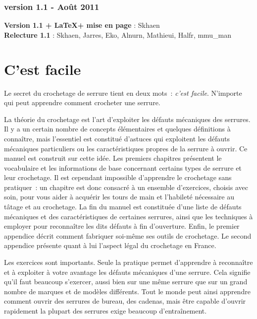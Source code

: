 \documentclass[a4paper,french,11pt,twoside]{report}
\begin{document}
{\centering \subsection*{version 1.1 - Août 2011}}

\medskip
\noindent \textbf{Version 1.1 + \LaTeX + mise en page} : Skhaen \\
\noindent \textbf{Relecture 1.1} : Skhaen, Jarres, Eko, Alnurn, Mathieui, Halfr, mmu\_man \\

\newpage
\strut
\newpage


\tableofcontents
\newpage

\chapter{C'est facile}

Le secret du crochetage de serrure tient en deux mots~: \emph{c'est facile}. N'importe qui peut apprendre comment crocheter une serrure.

\medskip
La théorie du crochetage est l'art d'exploiter les défauts mécaniques des serrures. Il y a un certain nombre de concepts élémentaires et quelques définitions à connaître, mais l'essentiel est constitué d'astuces qui exploitent les défauts mécaniques particuliers ou les caractéristiques propres de la serrure à ouvrir. Ce manuel est construit sur cette idée. Les premiers chapitres présentent le vocabulaire et les informations de base concernant certains types de serrure et leur crochetage. Il est cependant impossible d'apprendre le crochetage sans pratiquer~: un chapitre est donc consacré à un ensemble d'exercices, choisis avec soin, pour vous aider à acquérir les tours de main et l'habileté nécessaire au tâtage et au crochetage. La fin du manuel est constituée d'une liste de défauts mécaniques et des caractéristiques de certaines serrures, ainsi que les techniques à employer pour reconnaître les dits défauts à fin d'ouverture. Enfin, le premier appendice décrit comment fabriquer soi-même ses outils de crochetage. Le second appendice présente quant à lui l'aspect légal du crochetage en France.

Les exercices sont importants. Seule la pratique permet d'apprendre à reconnaître et à exploiter à votre avantage les défauts mécaniques d'une serrure. Cela signifie qu'il faut beaucoup s'exercer, aussi bien sur une même serrure que sur un grand nombre de marques et de modèles différents. Tout le monde peut ainsi apprendre comment ouvrir des serrures de bureau, des cadenas, mais être capable d'ouvrir rapidement la plupart des serrures exige beaucoup d'entraînement.
\end{document}
